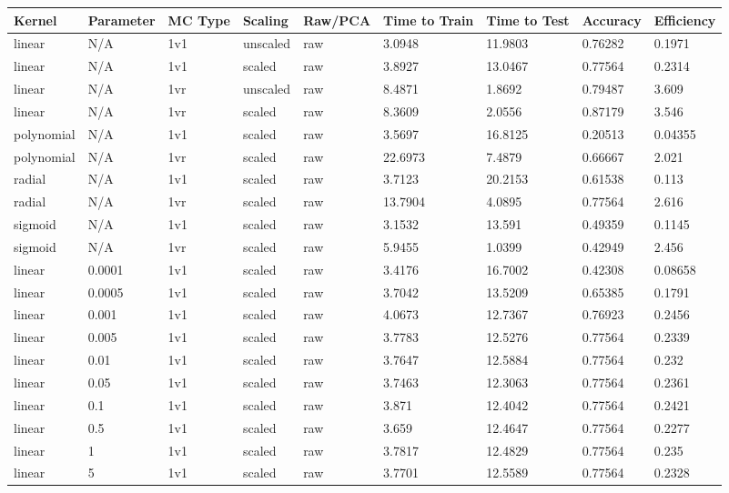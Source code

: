 \begin{longtable}{lllllllll}
\hline
Kernel & Parameter & MC Type & Scaling & Raw/PCA & Time to Train & Time to Test & Accuracy & Efficiency \\ \hline
linear & N/A & 1v1 & unscaled & raw & 3.0948 & 11.9803 & 0.76282 & 0.1971\\ \hline
linear & N/A & 1v1 & scaled & raw & 3.8927 & 13.0467 & 0.77564 & 0.2314\\ \hline
linear & N/A & 1vr & unscaled & raw & 8.4871 & 1.8692 & 0.79487 & 3.609\\ \hline
linear & N/A & 1vr & scaled & raw & 8.3609 & 2.0556 & 0.87179 & 3.546\\ \hline
polynomial & N/A & 1v1 & scaled & raw & 3.5697 & 16.8125 & 0.20513 & 0.04355\\ \hline
polynomial & N/A & 1vr & scaled & raw & 22.6973 & 7.4879 & 0.66667 & 2.021\\ \hline
radial & N/A & 1v1 & scaled & raw & 3.7123 & 20.2153 & 0.61538 & 0.113\\ \hline
radial & N/A & 1vr & scaled & raw & 13.7904 & 4.0895 & 0.77564 & 2.616\\ \hline
sigmoid & N/A & 1v1 & scaled & raw & 3.1532 & 13.591 & 0.49359 & 0.1145\\ \hline
sigmoid & N/A & 1vr & scaled & raw & 5.9455 & 1.0399 & 0.42949 & 2.456\\ \hline
linear & 0.0001 & 1v1 & scaled & raw & 3.4176 & 16.7002 & 0.42308 & 0.08658\\ \hline
linear & 0.0005 & 1v1 & scaled & raw & 3.7042 & 13.5209 & 0.65385 & 0.1791\\ \hline
linear & 0.001 & 1v1 & scaled & raw & 4.0673 & 12.7367 & 0.76923 & 0.2456\\ \hline
linear & 0.005 & 1v1 & scaled & raw & 3.7783 & 12.5276 & 0.77564 & 0.2339\\ \hline
linear & 0.01 & 1v1 & scaled & raw & 3.7647 & 12.5884 & 0.77564 & 0.232\\ \hline
linear & 0.05 & 1v1 & scaled & raw & 3.7463 & 12.3063 & 0.77564 & 0.2361\\ \hline
linear & 0.1 & 1v1 & scaled & raw & 3.871 & 12.4042 & 0.77564 & 0.2421\\ \hline
linear & 0.5 & 1v1 & scaled & raw & 3.659 & 12.4647 & 0.77564 & 0.2277\\ \hline
linear & 1 & 1v1 & scaled & raw & 3.7817 & 12.4829 & 0.77564 & 0.235\\ \hline
linear & 5 & 1v1 & scaled & raw & 3.7701 & 12.5589 & 0.77564 & 0.2328\\ \hline

\end{longtable}

